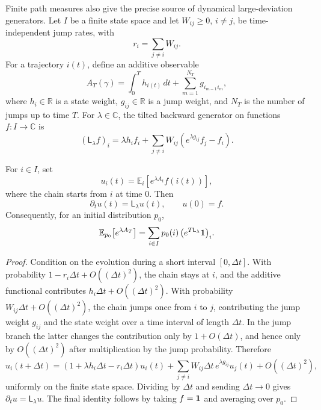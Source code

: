 Finite path measures also give the precise source of dynamical
large-deviation generators.  Let \(I\) be a finite state space and let
\(W_{ij}\ge0\), \(i\ne j\), be time-independent jump rates, with
\[
  r_i=\sum_{j\ne i}W_{ij}.
\]
For a trajectory \(i(t)\), define an additive observable
\begin{equation}
  A_T(\gamma)
  =
  \int_0^T h_{i(t)}\,dt
  +
  \sum_{m=1}^{N_T} g_{i_{m-1}i_m},
  \label{eq:finite-additive-jump-observable}
\end{equation}
where \(h_i\in\mathbb R\) is a state weight, \(g_{ij}\in\mathbb R\) is a
jump weight, and \(N_T\) is the number of jumps up to time \(T\).  For
\(\lambda\in\mathbb C\), the tilted backward generator on functions
\(f:I\to\mathbb C\) is
\begin{equation}
  (\mathsf L_\lambda f)_i
  =
  \lambda h_i f_i
  +
  \sum_{j\ne i}
  W_{ij}
  \left(e^{\lambda g_{ij}}f_j-f_i\right).
  \label{eq:finite-tilted-generator}
\end{equation}

\begin{proposition}
\label{prop:finite-feynman-kac-tilted-generator}
For \(i\in I\), set
\[
  u_i(t)=\mathbb E_i[e^{\lambda A_t}f(i(t))],
\]
where the chain starts from \(i\) at time \(0\).  Then
\[
  \partial_tu(t)=\mathsf L_\lambda u(t),
  \qquad
  u(0)=f .
\]
Consequently, for an initial distribution \(p_0\),
\begin{equation}
  \mathbb E_{p_0}\!\left[e^{\lambda A_T}\right]
  =
  \sum_{i\in I}p_0(i)\,
  \bigl(e^{T\mathsf L_\lambda}{\bf 1}\bigr)_i .
  \label{eq:finite-feynman-kac-mgf}
\end{equation}
\end{proposition}

\begin{proof}
Condition on the evolution during a short interval \([0,\Delta t]\).  With
probability \(1-r_i\Delta t+O((\Delta t)^2)\), the chain stays at \(i\), and
the additive functional contributes \(h_i\Delta t+O((\Delta t)^2)\).  With
probability \(W_{ij}\Delta t+O((\Delta t)^2)\), the chain jumps once from
\(i\) to \(j\), contributing the jump weight \(g_{ij}\) and the state weight
over a time interval of length \(\Delta t\).  In the jump branch the latter
changes the contribution only by \(1+O(\Delta t)\), and hence only by
\(O((\Delta t)^2)\) after multiplication by the jump probability.  Therefore
\[
  u_i(t+\Delta t)
  =
  \left(1+\lambda h_i\Delta t-r_i\Delta t\right)u_i(t)
  +
  \sum_{j\ne i}
  W_{ij}\Delta t\,e^{\lambda g_{ij}}u_j(t)
  +
  O((\Delta t)^2),
\]
uniformly on the finite state space.  Dividing by \(\Delta t\) and sending
\(\Delta t\to0\) gives \(\partial_tu=\mathsf L_\lambda u\).  The final
identity follows by taking \(f={\bf 1}\) and averaging over \(p_0\).
\end{proof}

